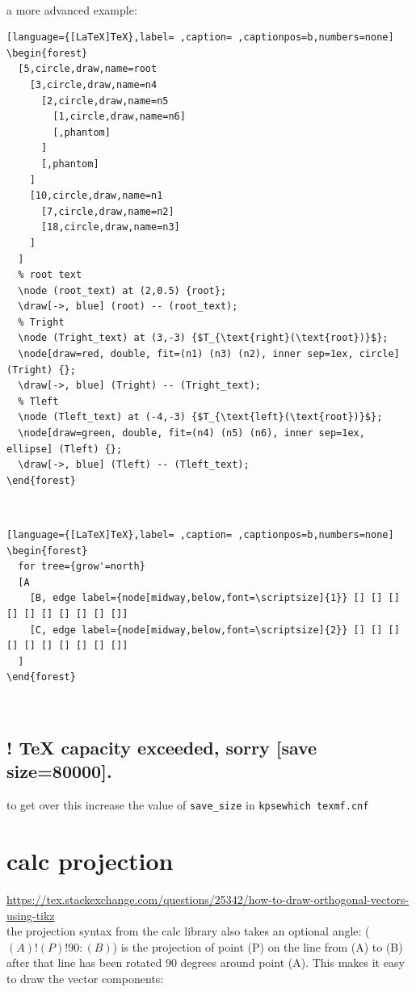 \documentclass[a4paper,12pt]{article}
\begin{document}
\\[0pt]

a more advanced example:\\[0pt]
\begin{lstlisting}[language={[LaTeX]TeX},label= ,caption= ,captionpos=b,numbers=none]
\begin{forest}
  [5,circle,draw,name=root
    [3,circle,draw,name=n4
      [2,circle,draw,name=n5
        [1,circle,draw,name=n6]
        [,phantom]
      ]
      [,phantom]
    ]
    [10,circle,draw,name=n1
      [7,circle,draw,name=n2]
      [18,circle,draw,name=n3]
    ]
  ]
  % root text
  \node (root_text) at (2,0.5) {root};
  \draw[->, blue] (root) -- (root_text);
  % Tright
  \node (Tright_text) at (3,-3) {$T_{\text{right}(\text{root})}$};
  \node[draw=red, double, fit=(n1) (n3) (n2), inner sep=1ex, circle] (Tright) {};
  \draw[->, blue] (Tright) -- (Tright_text);
  % Tleft
  \node (Tleft_text) at (-4,-3) {$T_{\text{left}(\text{root})}$};
  \node[draw=green, double, fit=(n4) (n5) (n6), inner sep=1ex, ellipse] (Tleft) {};
  \draw[->, blue] (Tleft) -- (Tleft_text);
\end{forest}
\end{lstlisting}

\\[0pt]

\begin{lstlisting}[language={[LaTeX]TeX},label= ,caption= ,captionpos=b,numbers=none]
\begin{forest}
  for tree={grow'=north}
  [A
    [B, edge label={node[midway,below,font=\scriptsize]{1}} [] [] [] [] [] [] [] [] [] []]
    [C, edge label={node[midway,below,font=\scriptsize]{2}} [] [] [] [] [] [] [] [] [] []]
  ]
\end{forest}
\end{lstlisting}

\\[0pt]

\subsection{! \TeX{} capacity exceeded, sorry [save size=80000].}
\label{sec:orga3a1e9d}
to get over this increase the value of \texttt{save\_size} in \texttt{kpsewhich texmf.cnf}\\[0pt]
\section{calc projection}
\label{sec:org14805dd}
\url{https://tex.stackexchange.com/questions/25342/how-to-draw-orthogonal-vectors-using-tikz}\\[0pt]
the projection syntax from the calc library also takes an optional angle: (\((A)!(P)!90:(B)\)) is the projection of point (P) on the line from (A) to (B) after that line has been rotated 90 degrees around point (A). This makes it easy to draw the vector components:\\[0pt]
\end{document}
